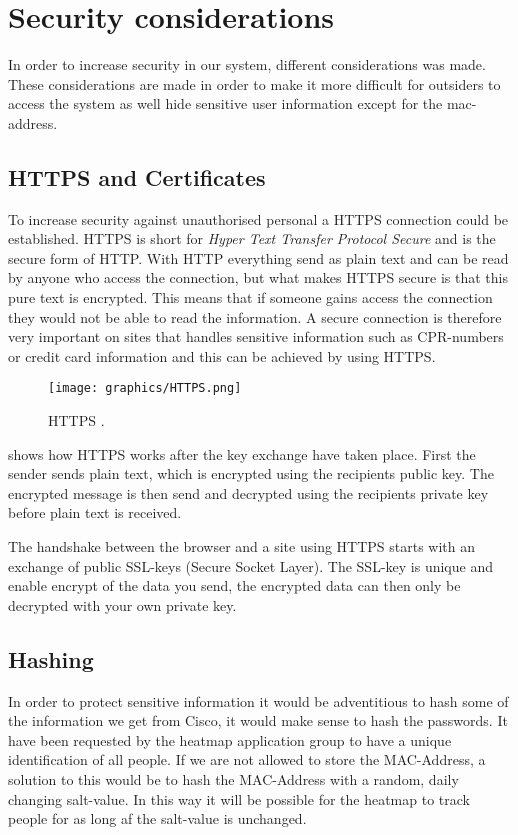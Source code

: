 \section{Security considerations}
In order to increase security in our system, different considerations was made. These considerations are made in order to make it more difficult for outsiders to access the system as well hide sensitive user information except for the mac-address.

\subsection*{HTTPS and Certificates} 
To increase security against unauthorised personal a HTTPS connection could be established. HTTPS is short for \textit{Hyper Text Transfer Protocol Secure} and is the secure form of HTTP. With HTTP everything send as plain text and can be read by anyone who access the connection, but what makes HTTPS secure is that this pure text is encrypted. This means that if someone gains access the connection they would not be able to read the information. A secure connection is therefore very important on sites that handles sensitive information such as CPR-numbers or credit card information and this can be achieved by using HTTPS\cite{HTTPS}.

\begin{figure}[ht]
	\begin{center}
		\texttt{[image: graphics/HTTPS.png]}
		\caption{HTTPS \cite{https_pic}.}
		\label{fig:HTTPS}
	\end{center} 
\end{figure}

 shows how HTTPS works after the key exchange have taken place. First the sender sends plain text, which is encrypted using the recipients public key. The encrypted message is then send and decrypted using the recipients private key before plain text is received.

The handshake between the browser and a site using HTTPS starts with an exchange of public SSL-keys (Secure Socket Layer). The SSL-key is unique and enable encrypt of the data you send, the encrypted data can then only be decrypted with your own private key\cite{HTTPS}. 

\subsection*{Hashing}
In order to protect sensitive information it would be adventitious to hash some of the information we get from Cisco, it would make sense to hash the passwords. 
It have been requested by the heatmap application group to have a unique identification of all people. If we are not allowed to store the MAC-Address, a solution to this would be to hash the MAC-Address with a random, daily changing salt-value. In this way it will be possible for the heatmap to track people for as long af the salt-value is unchanged.

